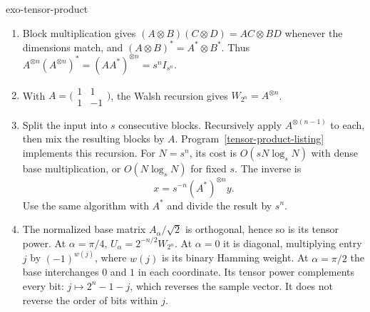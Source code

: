 \begin{correction}{exo-tensor-product}
\begin{enumerate}
\item Block multiplication gives
$(A\otimes B)(C\otimes D)=AC\otimes BD$ whenever the dimensions match,
and $(A\otimes B)^*=A^*\otimes B^*$.
Thus $A^{\otimes n}(A^{\otimes n})^*=(AA^*)^{\otimes n}=s^nI_{s^n}$.
\item With $A=\bigl(\begin{smallmatrix}1&1\\1&-1\end{smallmatrix}\bigr)$,
the Walsh recursion gives $W_{2^n}=A^{\otimes n}$.
\item Split the input into $s$ consecutive blocks. Recursively apply
$A^{\otimes(n-1)}$ to each, then mix the resulting blocks by $A$.
Program~\ref{tensor-product-listing} implements this recursion.
For $N=s^n$, its cost is $O(sN\log_sN)$ with dense base multiplication,
or $O(N\log_sN)$ for fixed $s$. The inverse is
\[
 x=s^{-n}(A^*)^{\otimes n}y.
\]
Use the same algorithm with $A^*$ and divide the result by $s^n$.
\begin{listing}[H]
\caption{Applying a tensor power without forming its matrix.}
\label{tensor-product-listing}
\end{listing}
\item The normalized base matrix $A_\alpha/\sqrt2$ is orthogonal, hence so
is its tensor power. At $\alpha=\pi/4$,
$U_\alpha=2^{-n/2}W_{2^n}$. At $\alpha=0$ it is diagonal, multiplying
entry $j$ by $(-1)^{w(j)}$, where $w(j)$ is its binary Hamming weight.
At $\alpha=\pi/2$ the base interchanges $0$ and $1$ in each coordinate.
Its tensor power complements every bit: $j\mapsto2^n-1-j$, which reverses
the sample vector. It does not reverse the order of bits within $j$.
\end{enumerate}
\end{correction}

